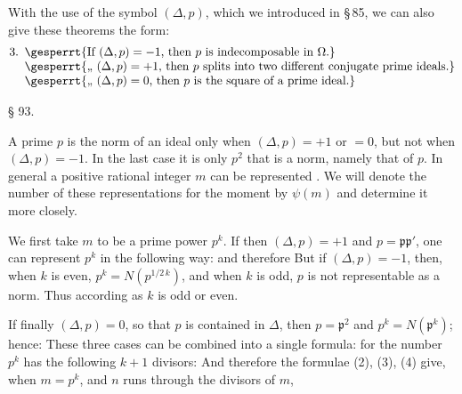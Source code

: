 With the use of the symbol $(\Delta, p)$, which we introduced in §\,85, we can also give these theorems the form:
\[
\begin{array}{@{}l@{\enspace}l@{}}
\text{3.} & \gesperrt{\text{If } \ensuremath{(\Delta, p) = -1} \text{, then } \ensuremath{p} \text{ is indecomposable in } \ensuremath{\Omega}\text{.}} \\
 & \gesperrt{\text{„} \ \ensuremath{(\Delta, p) = +1} \text{, then } \ensuremath{p} \text{ splits into two different conjugate prime ideals.}} \\
 & \gesperrt{\text{„} \ \ensuremath{(\Delta, p) = 0} \text{, then } \ensuremath{p} \text{ is the square of a prime ideal.}}
\end{array}
\]

\begin{center}
§ 93. 
\end{center}

A prime $p$ is the norm of an ideal only when
$(\Delta, p) = +1$ or $= 0$, but not when $(\Delta, p) = -1$.
In the last case it is only $p^2$ that is a norm, namely that of $p$. In
general a positive rational integer $m$ can be represented . We will denote the number of
these representations for the moment by $\psi(m)$
and determine it more closely.

We first take $m$ to be a prime power $p^k$. If then
$(\Delta, p) = +1$ and $p = \mathfrak{p}\mathfrak{p}'$, one can represent $p^k$ in the following way:
and therefore
But if $(\Delta, p) = -1$, then, when $k$ is even, $p^k = N(p^{1/2\,k})$,
and when $k$ is odd, $p$ is not representable as a norm. Thus
according as $k$ is odd or even.

If finally $(\Delta, p) = 0$, so that $p$ is contained in $\Delta$, then $p = \mathfrak{p}^2$
and $p^k = N(\mathfrak{p}^k)$; hence:
These three cases can be combined into a single formula:
for the number $p^k$ has the following $k+1$ divisors:
And therefore the formulae (2), (3), (4) give, when $m = p^k$,
and $n$ runs through the divisors of $m$,
